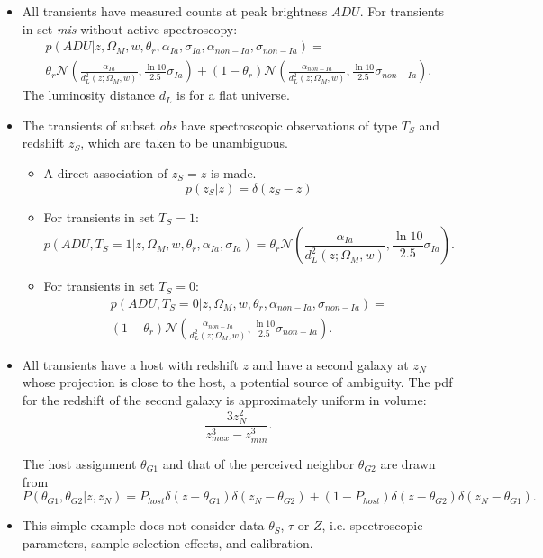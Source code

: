 \documentclass[preprint]{aastex}
\begin{document}
\begin{itemize}
\item All transients have measured counts at peak brightness $\mathit{ADU}$.
For transients in set {\it mis} without active spectroscopy:
\begin{multline}
p(\mathit{ADU}| z, \Omega_M, w, \theta_r, \alpha_{Ia},\sigma_{Ia}, \alpha_{\mathit{non-Ia}},\sigma_{\mathit{non-Ia}})=\\
\theta_r\mathcal{N}\left(\frac{\alpha_{Ia}}{d_L^2(z;\Omega_M, w)}, \frac{\ln{10}}{2.5}\sigma_{Ia}\right)+\left(1-\theta_r\right)
\mathcal{N}\left(\frac{\alpha_{\mathit{non-Ia}}}{d_L^2(z;\Omega_M, w)}, \frac{\ln{10}}{2.5}\sigma_{\mathit{non-Ia}}\right).
\end{multline}
The luminosity distance $d_L$ is for a flat universe.  
\item The transients of subset {\it obs} have spectroscopic observations of type $T_S$ and redshift
$z_S$, which are taken to be unambiguous.
\begin{itemize}
\item A direct association of $z_S=z$ is made.
\begin{equation}
p(z_S|z) = \delta(z_S-z)
\label{specz:eqn}
\end{equation}
\item For transients in set $T_S=1$:
\begin{equation}
p(\mathit{ADU}, T_S=1 | z, \Omega_M, w, \theta_r, \alpha_{Ia},\sigma_{Ia})=
\theta_r\mathcal{N}\left(\frac{\alpha_{Ia}}{d_L^2(z;\Omega_M, w)}, \frac{\ln{10}}{2.5}\sigma_{Ia}\right).
\end{equation}
\item For transients in set $T_S=0$:
\begin{multline}
p(\mathit{ADU}, T_S=0 | z, \Omega_M, w, \theta_r, \alpha_{\mathit{non-Ia}},\sigma_{\mathit{non-Ia}})= \\
\left(1-\theta_r\right)
\mathcal{N}\left(\frac{\alpha_{\mathit{non-Ia}}}{d_L^2(z;\Omega_M, w)}, \frac{\ln{10}}{2.5}\sigma_{\mathit{non-Ia}}\right).
\end{multline}
\end{itemize}
\item All transients have a host with redshift $z$ and have a second
galaxy at $z_N$ whose projection is close to the host, a potential source of ambiguity.
The pdf for the redshift of the second galaxy is approximately uniform in volume:
\begin{equation}
\frac{3 z_N^2}{z_{max}^3 - z_{min}^3}.
\end{equation}

The host assignment $\theta_{G1}$ and that of the perceived neighbor
$\theta_{G2}$ are drawn from
\begin{equation}
P(\theta_{G1},\theta_{G2}|z, z_N) =
	P_{host}\delta(z-\theta_{G1})\delta(z_N-\theta_{G2}) +
	(1-P_{host}) \delta(z-\theta_{G2})\delta(z_N-\theta_{G1}).
\end{equation}

\item This simple example does not consider data $\theta_S$, $\tau$ or $Z$, i.e.
spectroscopic parameters, sample-selection effects, and calibration.
\end{itemize}
\end{document}
